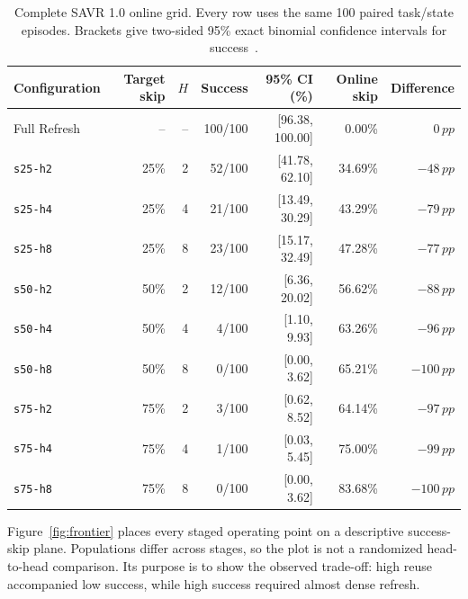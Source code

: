 \documentclass[11pt]{article}
\newcommand{\pp}{\,pp}
\newcommand{\code}[1]{\texttt{#1}}
\begin{document}
\begin{table}[H]
\centering
\scriptsize
\caption{Complete SAVR 1.0 online grid. Every row uses the same 100 paired task/state episodes. Brackets give two-sided 95\% exact binomial confidence intervals for success~\cite{clopperpearson}.}
\label{tab:savr1}
\begin{tabular}{lrrrrrr}
\toprule
Configuration & Target skip & $H$ & Success & 95\% CI (\%) & Online skip & Difference \\
\midrule
Full Refresh & -- & -- & 100/100 & [96.38, 100.00] & 0.00\% & $0\pp$ \\
\code{s25-h2} & 25\% & 2 & 52/100 & [41.78, 62.10] & 34.69\% & $-48\pp$ \\
\code{s25-h4} & 25\% & 4 & 21/100 & [13.49, 30.29] & 43.29\% & $-79\pp$ \\
\code{s25-h8} & 25\% & 8 & 23/100 & [15.17, 32.49] & 47.28\% & $-77\pp$ \\
\code{s50-h2} & 50\% & 2 & 12/100 & [6.36, 20.02] & 56.62\% & $-88\pp$ \\
\code{s50-h4} & 50\% & 4 & 4/100 & [1.10, 9.93] & 63.26\% & $-96\pp$ \\
\code{s50-h8} & 50\% & 8 & 0/100 & [0.00, 3.62] & 65.21\% & $-100\pp$ \\
\code{s75-h2} & 75\% & 2 & 3/100 & [0.62, 8.52] & 64.14\% & $-97\pp$ \\
\code{s75-h4} & 75\% & 4 & 1/100 & [0.03, 5.45] & 75.00\% & $-99\pp$ \\
\code{s75-h8} & 75\% & 8 & 0/100 & [0.00, 3.62] & 83.68\% & $-100\pp$ \\
\bottomrule
\end{tabular}
\end{table}

Figure~\ref{fig:frontier} places every staged operating point on a descriptive success-skip plane. Populations differ across stages, so the plot is not a randomized head-to-head comparison. Its purpose is to show the observed trade-off: high reuse accompanied low success, while high success required almost dense refresh.
\end{document}
